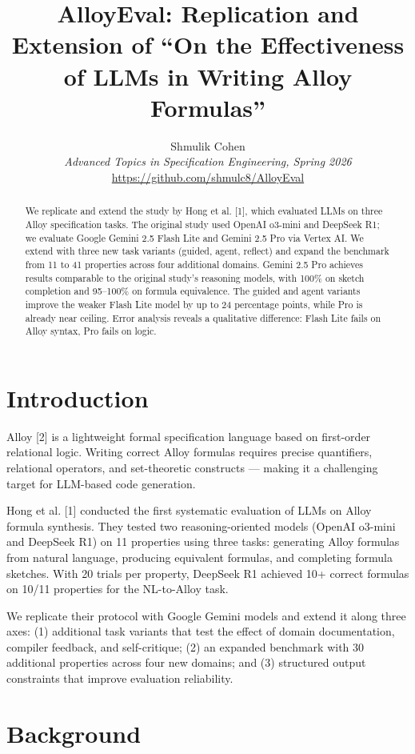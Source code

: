 \documentclass[11pt]{article}
\title{AlloyEval: Replication and Extension of ``On the Effectiveness of LLMs in Writing Alloy Formulas''}
\author{Shmulik Cohen\\
\textit{Advanced Topics in Specification Engineering, Spring 2026}\\
\url{https://github.com/shmulc8/AlloyEval}}
\date{}
\begin{document}
\maketitle

\begin{abstract}
We replicate and extend the study by Hong et al. [1], which evaluated LLMs on three Alloy specification tasks.
The original study used OpenAI o3-mini and DeepSeek R1; we evaluate Google Gemini 2.5 Flash Lite and Gemini 2.5 Pro via Vertex AI.
We extend with three new task variants (guided, agent, reflect) and expand the benchmark from 11 to 41 properties across four additional domains.
Gemini 2.5 Pro achieves results comparable to the original study's reasoning models, with 100\% on sketch completion and 95--100\% on formula equivalence. The guided and agent variants improve the weaker Flash Lite model by up to 24 percentage points, while Pro is already near ceiling. Error analysis reveals a qualitative difference: Flash Lite fails on Alloy syntax, Pro fails on logic.
\end{abstract}

\section{Introduction}

Alloy [2] is a lightweight formal specification language based on first-order relational logic. Writing correct Alloy formulas requires precise quantifiers, relational operators, and set-theoretic constructs --- making it a challenging target for LLM-based code generation.

Hong et al. [1] conducted the first systematic evaluation of LLMs on Alloy formula synthesis. They tested two reasoning-oriented models (OpenAI o3-mini and DeepSeek R1) on 11 properties using three tasks: generating Alloy formulas from natural language, producing equivalent formulas, and completing formula sketches. With 20 trials per property, DeepSeek R1 achieved 10+ correct formulas on 10/11 properties for the NL-to-Alloy task.

We replicate their protocol with Google Gemini models and extend it along three axes: (1) additional task variants that test the effect of domain documentation, compiler feedback, and self-critique; (2) an expanded benchmark with 30 additional properties across four new domains; and (3) structured output constraints that improve evaluation reliability.

\section{Background}
\end{document}
